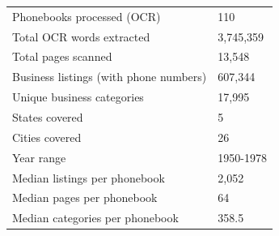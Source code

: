 \begin{tabular}[t]{ll}
\toprule
 & \\
\midrule
Phonebooks processed (OCR) & 110\\
Total OCR words extracted & 3,745,359\\
Total pages scanned & 13,548\\
Business listings (with phone numbers) & 607,344\\
Unique business categories & 17,995\\
\addlinespace
States covered & 5\\
Cities covered & 26\\
Year range & 1950-1978\\
Median listings per phonebook & 2,052\\
Median pages per phonebook & 64\\
\addlinespace
Median categories per phonebook & 358.5\\
\bottomrule
\end{tabular}
